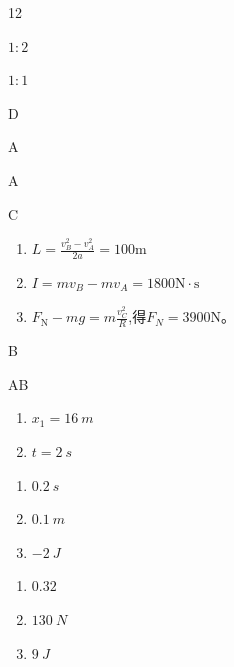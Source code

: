 \item 12
\item $ 1:2 $
\item $ 1:1 $
\item D
\item A
\item A
\item C
\item \begin {enumerate} \renewcommand {\labelenumi }{\arabic {enumi}.} \item $L = \frac { v _ { B } ^ { 2 } - v _ { A } ^ { 2 } } { 2 a } = 100 \mathrm { m }$ \item $I = m v _ { B } - m v _ { A } = 1800 \mathrm { N } \cdot \mathrm { s }$ \item $F _ { \mathrm { N } } - m g = m \frac { v _ { C } ^ { 2 } } { R }$,得$F _ { N } = 3900 \mathrm { N }$。 \par \par \end {enumerate} \par \par 
\item B
\item AB
\item \begin {enumerate} \renewcommand {\labelenumi }{\arabic {enumi}.} \item $ x_{1}=16\ m $ \par \item $ t=2\ s $ \par \end {enumerate} \par \par 
\item \begin {enumerate} \renewcommand {\labelenumi }{\arabic {enumi}.} \item $ 0.2\ s $ \item $ 0.1\ m $ \item $ -2\ J $ \par \end {enumerate} \par \par 
\item \begin {enumerate} \renewcommand {\labelenumi }{\arabic {enumi}.} \item $ 0.32 $ \item $ 130\ N $ \item $ 9\ J $ \par \end {enumerate} \par \par 
